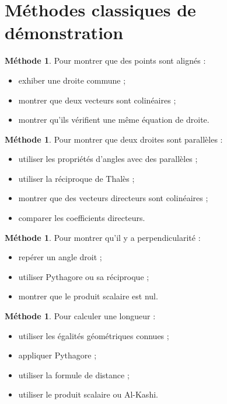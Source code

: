 \documentclass[11pt,a4paper]{article}
\theoremstyle{definition}
\newtheorem{methode}[definition]{Méthode}
\theoremstyle{plain}
\begin{document}
\newpage

\section{Méthodes classiques de démonstration}

\begin{methode}
Pour montrer que des points sont alignés :
\begin{itemize}
    \item exhiber une droite commune ;
    \item montrer que deux vecteurs sont colinéaires ;
    \item montrer qu'ils vérifient une même équation de droite.
\end{itemize}
\end{methode}

\begin{methode}
Pour montrer que deux droites sont parallèles :
\begin{itemize}
    \item utiliser les propriétés d'angles avec des parallèles ;
    \item utiliser la réciproque de Thalès ;
    \item montrer que des vecteurs directeurs sont colinéaires ;
    \item comparer les coefficients directeurs.
\end{itemize}
\end{methode}

\begin{methode}
Pour montrer qu'il y a perpendicularité :
\begin{itemize}
    \item repérer un angle droit ;
    \item utiliser Pythagore ou sa réciproque ;
    \item montrer que le produit scalaire est nul.
\end{itemize}
\end{methode}

\begin{methode}
Pour calculer une longueur :
\begin{itemize}
    \item utiliser les égalités géométriques connues ;
    \item appliquer Pythagore ;
    \item utiliser la formule de distance ;
    \item utiliser le produit scalaire ou Al-Kashi.
\end{itemize}
\end{methode}
\end{document}
